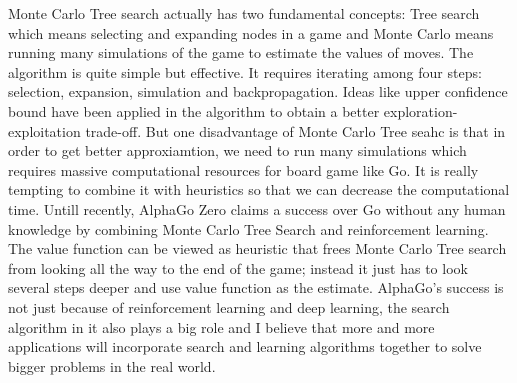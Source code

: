 \documentclass[12pt,a4paper]{article}
\begin{document}
Monte Carlo Tree search actually has two fundamental concepts: Tree search which means selecting and expanding nodes in a game and Monte Carlo means running many simulations of the game to estimate the values of moves. The algorithm is quite simple but effective. It requires iterating among four steps: selection, expansion, simulation and backpropagation. Ideas like upper confidence bound have been applied in the algorithm to obtain a better exploration-exploitation trade-off. But one disadvantage of Monte Carlo Tree seahc is that in order to get better approxiamtion, we need to run many simulations which requires massive computational resources for board game like Go. It is really tempting to combine it with heuristics so that we can decrease the computational time. Untill recently, AlphaGo Zero claims a success over Go without any human knowledge by combining Monte Carlo Tree Search and reinforcement learning. The value function can be viewed as heuristic that frees Monte Carlo Tree search from looking all the way to the end of the game; instead it just has to look several steps deeper and use value function as the estimate. AlphaGo's success is not just because of reinforcement learning and deep learning, the search algorithm in it also plays a big role and I believe that more and more applications will incorporate search and learning algorithms together to solve bigger problems in the real world.

 
\end{document}

